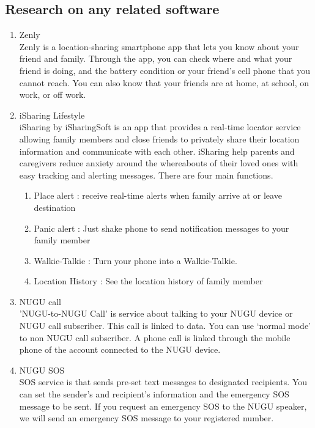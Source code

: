 \documentclass[conference]{IEEEtran}
\begin{document}
\subsection{Research on any related software}
\begin{enumerate}
    \item Zenly\\
    Zenly is a location-sharing smartphone app that lets you know about your friend and family. Through the app, you can check where and what your friend is doing, and the battery condition or your friend’s cell phone that you cannot reach. You can also know that your friends are at home, at school, on work, or off work.\\
    \item iSharing Lifestyle\\
iSharing by iSharingSoft is an app that provides a real-time locator service allowing family members and close friends to privately share their location information and communicate with each other. iSharing help parents and caregivers reduce anxiety around the whereabouts of their loved ones with easy tracking and alerting messages. There are four main functions.
\begin{enumerate}
    \item Place alert : receive real-time alerts when family arrive at or leave destination
    \item Panic alert : Just shake phone to send notification messages to your family member
    \item Walkie-Talkie : Turn your phone into a Walkie-Talkie.
    \item Location History : See the location history of family member\\
\end{enumerate}
\item NUGU call\\
'NUGU-to-NUGU Call' is service about talking to your NUGU device or NUGU call subscriber.
This call is linked to data. You can use ‘normal mode’ to non NUGU call subscriber. A phone call is linked through the mobile phone of the account connected to the NUGU device.\\
\item NUGU SOS\\
 SOS service is that sends pre-set text messages to designated recipients. You can set the sender's and recipient's information and the emergency SOS message to be sent. If you request an emergency SOS to the NUGU speaker, we will send an emergency SOS message to your registered number.\\
\end{enumerate}
\end{document}
